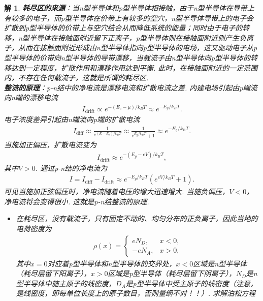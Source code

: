 \documentclass[UTF8,10pt,a4paper]{article}
\theoremstyle{Problem}
\theoremstyle{Solution}
\newtheorem*{sol}{解}
\begin{document}
\begin{sol}
    \textbf{耗尽区的来源}：当n型半导体和p型半导体相接触，由于n型半导体在导带上有较多的电子，而p型半导体在价带上有较多的空穴，n型半导体导带上的电子会扩散到p型半导体的价带上与空穴结合从而降低系统的能量；同时由于电子的转移，n型半导体在接触面附近留下正离子，p型半导体则在接触面附近则产生负离子，从而在接触面附近形成由n型半导体指向p型半导体的电场，这又驱动电子从p型半导体的价带向n型半导体的导带漂移，当载流子由n型半导体向p型半导体的转移达到一定程度，扩散作用和漂移作用达到平衡. 此时，在接触面附近的一定范围内，不存在任何载流子，这就是所谓的耗尽区.\\
    \textbf{整流的原理}：p-n结中的净电流是漂移电流和扩散电流之差. 内建电场引起由p端流向n端的漂移电流
    \begin{align}
        I_{\text{drift}}\propto e^{-(E_c-\mu)/k_BT}\approx e^{-E_g/k_BT}.
    \end{align}
    电子浓度差异引起由n端流向p端的扩散电流
    \begin{align}
        I_{\text{diff}}\approx\frac{1}{e^{(E-E_c)/k_BT}}\approx\frac{1}{e^{E_g/k_BT}+1}\approx e^{-E_g/k_BT}.
    \end{align}
    当施加正偏压，扩散电流变为
    \begin{align}
        I_{\text{drift}}\approx e^{-(E_g-eV)/k_BT},
    \end{align}
    其中$V>0$. 通过p-n结的净电流为
    \begin{align}
        I=I_{\text{diff}}-I_{\text{drift}}\approx e^{-E_g/k_BT}(e^{eV/k_BT}+1).
    \end{align}
    可见当施加正弦偏压时，净电流随着电压的增大迅速增大. 当施负偏压，$V<0$，净电流将会变得很小. 这就是p-n结整流的原理.
    \begin{itemize}
        \item[$\triangleright$] 在耗尽区，没有载流子，只有固定不动的、均匀分布的正负离子，因此当地的电荷密度为
        \begin{align}
            \rho(x)=\left\{\begin{array}{ll}
                eN_D,&x<0,\\
                -eN_A,&x>0,
            \end{array}\right.
        \end{align}
        其中$x=0$对应着p型半导体和n型半导体的交界处，$x<0$区域是n型半导体（耗尽层留下阳离子），$x>0$区域是p型半导体（耗尽层留下阴离子），$N_D$是n型半导体中施主原子的线密度，$D_A$是p型半导体中受主原子的线密度（注意，是线密度，即每单位长度上的原子数目，否则量纲不对！！）.
        求解泊松方程

\end{itemize}
\end{sol}
\end{document}
